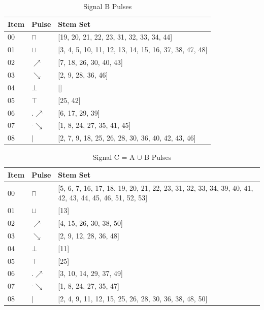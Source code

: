\documentclass[10pt,journal]{IEEEtran}
\begin{document}
\begin{table}[H] \caption{Signal B Pulses}\centering\begin{tabular}{|p{.4cm}|p{.5cm}|p{6.5cm}|}\hline Item&Pulse &Stem Set\\ \hline 00& \footnotesize$\sqcap$ & \footnotesize[19, 20, 21, 22, 23, 31, 32, 33, 34, 44]\\ \hline 01& \footnotesize$\sqcup$ & \footnotesize[3, 4, 5, 10, 11, 12, 13, 14, 15, 16, 37, 38, 47, 48]\\ \hline 02& \footnotesize$\nearrow$ & \footnotesize[7, 18, 26, 30, 40, 43]\\ \hline 03& \footnotesize$\searrow$ & \footnotesize[2, 9, 28, 36, 46]\\ \hline 04& \footnotesize$\bot$ & \footnotesize[]\\ \hline 05& \footnotesize$\top$ & \footnotesize[25, 42]\\ \hline 06& \footnotesize$.\nearrow$ & \footnotesize[6, 17, 29, 39]\\ \hline 07& \footnotesize$^.\searrow$ & \footnotesize[1, 8, 24, 27, 35, 41, 45]\\ \hline 08& \footnotesize$|$ & \footnotesize[2, 7, 9, 18, 25, 26, 28, 30, 36, 40, 42, 43, 46]\\ \hline \end{tabular} \end{table} 
\begin{table}[H] \caption{Signal C = A $\cup$ B Pulses}\centering\begin{tabular}{|p{.4cm}|p{.5cm}|p{6.5cm}|}\hline Item&Pulse &Stem Set\\ \hline 00& \footnotesize$\sqcap$ & \footnotesize[5, 6, 7, 16, 17, 18, 19, 20, 21, 22, 23, 31, 32, 33, 34, 39, 40, 41, 42, 43, 44, 45, 46, 51, 52, 53]\\ \hline 01& \footnotesize$\sqcup$ & \footnotesize[13]\\ \hline 02& \footnotesize$\nearrow$ & \footnotesize[4, 15, 26, 30, 38, 50]\\ \hline 03& \footnotesize$\searrow$ & \footnotesize[2, 9, 12, 28, 36, 48]\\ \hline 04& \footnotesize$\bot$ & \footnotesize[11]\\ \hline 05& \footnotesize$\top$ & \footnotesize[25]\\ \hline 06& \footnotesize$.\nearrow$ & \footnotesize[3, 10, 14, 29, 37, 49]\\ \hline 07& \footnotesize$^.\searrow$ & \footnotesize[1, 8, 24, 27, 35, 47]\\ \hline 08& \footnotesize$|$ & \footnotesize[2, 4, 9, 11, 12, 15, 25, 26, 28, 30, 36, 38, 48, 50]\\ \hline \end{tabular} \end{table} 
\end{document}
